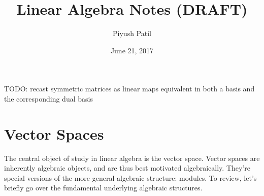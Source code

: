 \documentclass{article}
\begin{document}
\title{Linear Algebra Notes (DRAFT)}
\author{Piyush Patil}
\date{June 21, 2017}
\maketitle

TODO: recast symmetric matrices as linear maps equivalent in both a basis and the corresponding dual basis

\section{Vector Spaces}

The central object of study in linear algebra is the vector space. Vector spaces are inherently algebraic objects, and are thus best motivated algebraically. They're special versions of the more general algebraic structure: modules. To review, let's briefly go over the fundamental underlying algebraic structures.
\end{document}
